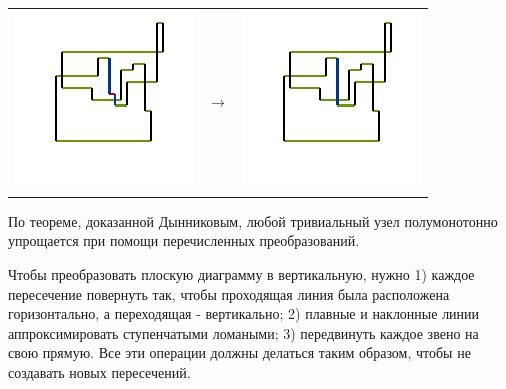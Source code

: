 \begin{itemize}
\begin{tabular}{
>{\centering\arraybackslash}m{3cm}
c
>{\centering\arraybackslash}m{3cm}
}
\includegraphics{images/rect-move-8.pdf}
&
$\rightarrow$
&
\includegraphics{images/rect-move-9.pdf}
\end{tabular}



\end{itemize}

По теореме, доказанной Дынниковым, любой тривиальный узел полумонотонно упрощается при помощи перечисленных преобразований.

Чтобы преобразовать плоскую диаграмму в вертикальную, нужно 1) каждое пересечение повернуть так, чтобы проходящая линия была расположена горизонтально, а переходящая - вертикально; 2) плавные и наклонные линии аппроксимировать ступенчатыми ломаными; 3) передвинуть каждое звено на свою прямую. Все эти операции должны делаться таким образом, чтобы не создавать новых пересечений.